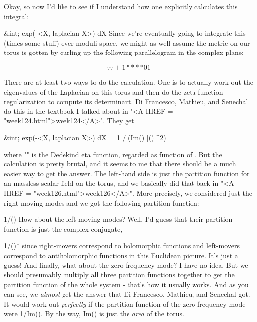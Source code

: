 Okay, so now I'd like to see if I understand how one explicitly
calculates this integral:

                 &int; exp(-<X, laplacian X>) dX
Since we're eventually going to integrate this (times some stuff) over
moduli space, we might as well assume the metric on our torus is gotten
by curling up the following parallelogram in the complex plane:


$$
                         \tau            \tau  + 1 
                         *             *




                      *              *
                      0              1
$$
    

There are at least two ways to do the calculation.  One is to actually
work out the eigenvalues of the Laplacian on this torus and then do the
zeta function regularization to compute its determinant.  Di Francesco,
Mathieu, and Senechal do this in the textbook I talked about in "<A
HREF = "week124.html">week124</A>".  They get

      &int; exp(-<X, laplacian X>) dX = 1 / (\sqrt Im(\tau )  |\eta (\tau )|^{2})

where "\eta " is the Dedekind eta function, regarded as function
of \tau .  But the calculation is pretty brutal, and it seems to me that
there should be a much easier way to get the answer.  The left-hand side
is just the partition function for an massless scalar field on the
torus, and we basically did that back in "<A HREF =
"week126.html">week126</A>".  More precisely, we considered just
the right-moving modes and we got the following partition function:

                           1/\eta (\tau )
How about the left-moving modes?  Well, I'd guess that their partition 
function is just the complex conjugate,

                           1/\eta (\tau )*
since right-movers correspond to holomorphic functions and left-movers
correspond to antiholomorphic functions in this Euclidean picture.  It's
just a guess!  And finally, what about the zero-frequency mode?  I have
no idea.  But we should presumably multiply all three partition
functions together to get the partition function of the whole system -
that's how it usually works.  And as you can see, we \emph{almost} get the
answer that Di Francesco, Mathieu, and Senechal got.  It would work out
\emph{perfectly} if the partition function of the zero-frequency mode were
1/\sqrt Im(\tau ).  By the way, Im(\tau ) is just the \emph{area} of the
torus.

